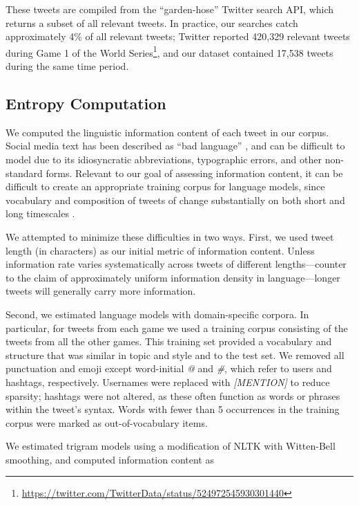 \documentclass[11pt,letterpaper]{article}
\begin{document}
These tweets are compiled from the ``garden-hose'' Twitter search API, which returns a subset of all relevant tweets. In practice, our searches catch approximately 4\% of all relevant tweets; Twitter reported 420,329 relevant tweets during Game 1 of the World Series\footnote{\url{https://twitter.com/TwitterData/status/524972545930301440}}, and our dataset contained 17,538 tweets during the same time period.

\subsection{Entropy Computation}

We computed the linguistic information content of each tweet in our corpus. Social media text has been described as ``bad language'' \cite{eisenstein2013}, and can be difficult to model due to its idiosyncratic abbreviations, typographic errors, and other non-standard forms. Relevant to our goal of assessing information content, it can be difficult to create an appropriate training corpus for language models, since vocabulary and composition of tweets of change substantially on both short and long timescales \cite{eisenstein2013}.

We attempted to minimize these difficulties in two ways.  First, we used tweet length (in characters) as our initial metric of information content. Unless information rate varies systematically across tweets of different lengths---counter to the claim of approximately uniform information density in language\cite{genzel2002,levy2007}---longer tweets will generally carry more information.

Second, we estimated language models with domain-specific corpora. In particular, for tweets from each game we used a training corpus consisting of the tweets from all the other games. This training set provided a vocabulary and structure that was similar in topic and style and to the test set.  We removed all punctuation and emoji except word-initial {\it @} and {\it \#}, which refer to users and hashtags, respectively.  Usernames were replaced with {\it [MENTION]} to reduce sparsity; hashtags were not altered, as these often function as words or phrases within the tweet's syntax.  Words with fewer than 5 occurrences in the training corpus were marked as out-of-vocabulary items.

We estimated trigram models using a modification of NLTK \cite{bird2006} with Witten-Bell smoothing, and computed information content as
\end{document}
